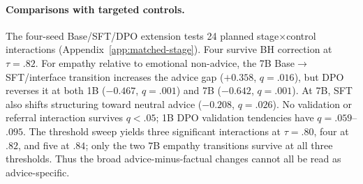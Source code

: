 \documentclass[11pt]{article}
\begin{document}
\begin{table}[t]
\centering
\small
\setlength{\tabcolsep}{3pt}
\caption{Change in the advice-minus-factual proxy gap across transitions
(plus-one-corrected prompt-clustered permutation tests, 10k draws; displayed
$q$ is BH-adjusted across all 28 adjacent-stage$\times$proxy tests). The
Base$\to$SFT column also changes the input serialization and is not a clean SFT
effect. Later raw $p\geq.168$.}
\label{tab:interaction}
\end{table}

\paragraph{Comparisons with targeted controls.} The four-seed
Base/SFT/DPO extension tests 24 planned stage$\times$control interactions
(Appendix~\ref{app:matched-stage}). Four survive BH correction at $\tau=.82$.
For empathy relative to emotional non-advice, the 7B Base$\to$SFT/interface
transition increases the advice gap
($+0.358$, $q=.016$), but DPO reverses it at both 1B ($-0.467$, $q=.001$) and
7B ($-0.642$, $q=.001$). At 7B, SFT also shifts structuring toward neutral
advice ($-0.208$, $q=.026$). No validation or referral interaction survives
$q<.05$; 1B DPO validation tendencies have $q=.059$--$.095$. The threshold
sweep yields three significant interactions at $\tau=.80$, four at $.82$, and
five at $.84$; only the two 7B
empathy transitions survive at all three thresholds. Thus the broad
advice-minus-factual changes cannot all be read as advice-specific.
\end{document}
